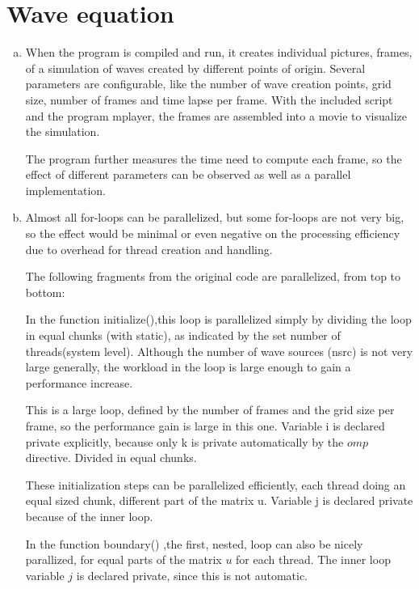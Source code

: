 \documentclass[a4paper]{article}
\begin{document}
\section{Wave equation}
\begin{enumerate}[(a)]
\item When the program is compiled and run, it creates individual pictures, frames, of a simulation of waves created by different points of origin. Several parameters are configurable, like the number of wave creation points, grid size, number of frames and time lapse per frame. With the included script and the program mplayer, the frames are assembled into a movie to visualize the simulation.

The program further measures the time need to compute each frame, so the effect of different parameters can be observed as well as a parallel implementation.

\item Almost all for-loops can be parallelized, but some for-loops are not very big, so the effect would be minimal or even negative on the processing efficiency due to overhead for thread creation and handling.

The following fragments from the original code are parallelized, from top to bottom:


In the function initialize(),this loop is parallelized simply by dividing the loop in equal chunks (with static), as indicated by the set number of threads(system level). Although the number of wave sources (nsrc) is not very large generally, the workload in the loop is large enough to gain a performance increase.



This is a large loop, defined by the number of frames and the grid size per frame, so the performance gain is large in this one. Variable i is declared private explicitly, because only k is private automatically by the $omp$ directive. Divided in equal chunks.



These initialization steps can be parallelized efficiently, each thread doing an equal sized chunk, different part of the matrix u. Variable j is declared private because of the inner loop.



In the function boundary() ,the first, nested, loop can also be nicely parallized, for equal parts of the matrix $u$ for each thread. The inner loop variable $j$ is declared private, since this is not automatic.


\end{enumerate}
\end{document}
